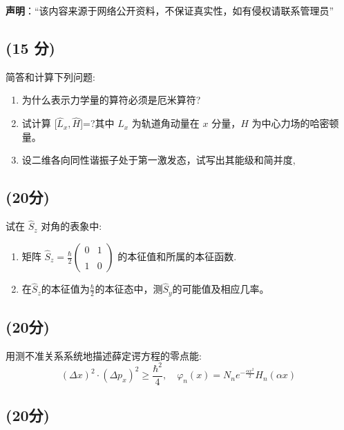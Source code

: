
\textbf{声明}：“该内容来源于网络公开资料，不保证真实性，如有侵权请联系管理员”

\subsection{(15 分)}
简答和计算下列问题:
\begin{enumerate}
    \item 为什么表示力学量的算符必须是厄米算符?
    \item 试计算 [$\hat{L}_x ,\hat{H}$]=?其中 $\hat{L}_x$ 为轨道角动量在 $x$ 分量，$\hat{H}$ 为中心力场的哈密顿量。
    \item 设二维各向同性谐振子处于第一激发态，试写出其能级和简并度,
\end{enumerate}
\subsection{(20分)}
试在 $\hat{S}_z$ 对角的表象中:
\begin{enumerate}
    \item 矩阵 $\hat{S}_z = \frac{\hbar}{2}\begin{pmatrix} 0 & 1 \\\\ 1 & 0 \end{pmatrix}$ 的本征值和所属的本征函数.
    \item 在$\hat{S}_z$的本征值为$\frac{\hbar}{2}$的本征态中，测$\hat{S}_y$的可能值及相应几率。
\end{enumerate}
\subsection{(20分)}
用测不准关系系统地描述薛定谔方程的零点能:
$$\left( \Delta x \right)^2 \cdot \left( \Delta p_x \right)^2 \geq \frac{\hbar^2}{4}, \quad
\varphi_n(x) = N_n e^{-\frac{\alpha x^2}{2}} H_n(\alpha x)~$$
\subsection{(20分)}

